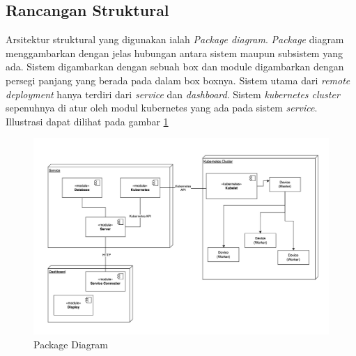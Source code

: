 \subsection{Rancangan Struktural}
\label{subsec:arsitektur-struktural}

Arsitektur struktural yang digunakan ialah \textit{Package diagram}. \textit{Package} diagram menggambarkan dengan jelas hubungan antara sistem maupun subsistem yang ada. Sistem digambarkan dengan sebuah box dan module digambarkan dengan persegi panjang yang berada pada dalam box boxnya. Sistem utama dari \textit{remote deployment} hanya terdiri dari \textit{service} dan \textit{dashboard}. Sistem \textit{kubernetes cluster} sepenuhnya di atur oleh modul kubernetes yang ada pada sistem \textit{service}. Illustrasi dapat dilihat pada gambar \ref{fig:package-diagram}

\begin{figure}[ht]
  \centering
  \includegraphics[width=1\textwidth]{resources/chapter-3/package-diagram.jpg}
  \caption{Package Diagram}
  \label{fig:package-diagram}
\end{figure}

